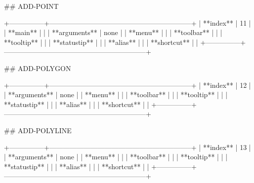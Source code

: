 ## ADD-POINT

+---------------+--------------------------------------------------------------+
| **index**     | 11                                                           |
| **main**      |                                                              |
| **arguments** | none                                                         |
| **menu**      |                                                              |
| **toolbar**   |                                                              |
| **tooltip**   |                                                              |
| **statustip** |                                                              |
| **alias**     |                                                              |
| **shortcut**  |                                                              |
+---------------+--------------------------------------------------------------+

## ADD-POLYGON

+---------------+--------------------------------------------------------------+
| **index**     | 12                                                           |
| **arguments** | none                                                         |
| **menu**      |                                                              |
| **toolbar**   |                                                              |
| **tooltip**   |                                                              |
| **statustip** |                                                              |
| **alias**     |                                                              |
| **shortcut**  |                                                              |
+---------------+--------------------------------------------------------------+


## ADD-POLYLINE

+---------------+--------------------------------------------------------------+
| **index**     | 13                                                           |
| **arguments** | none                                                         |
| **menu**      |                                                              |
| **toolbar**   |                                                              |
| **tooltip**   |                                                              |
| **statustip** |                                                              |
| **alias**     |                                                              |
| **shortcut**  |                                                              |
+---------------+--------------------------------------------------------------+


